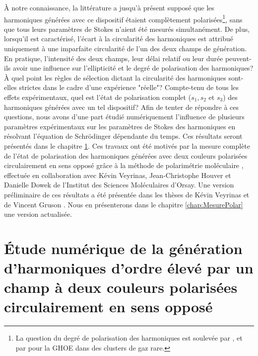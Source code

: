 \`{A} notre connaissance, la littérature a jusqu'à présent supposé que les harmoniques générées avec ce dispositif étaient complètement polarisées\footnote{La question du degré de polarisation des harmoniques est soulevée par , et par  pour la GHOE dans des clusters de gaz rare.}, sans que tous leurs paramètres de Stokes n'aient été mesurés simultanément. De plus, lorsqu'il est caractérisé, l'écart à la circularité des harmoniques est attribué uniquement à une imparfaite circularité de l'un des deux champs de génération. En pratique, l'intensité des deux champs, leur délai relatif ou leur durée peuvent-ils avoir une influence sur l'ellipticité et le degré de polarisation des harmoniques? \`{A} quel point les règles de sélection dictant la circularité des harmoniques sont-elles strictes dans le cadre d'une expérience "réelle"? Compte-tenu de tous les effets expérimentaux, quel est l'état de polarisation complet ($s_1, s_2$ et $s_3$) des harmoniques générées avec un tel dispositif? Afin de tenter de répondre à ces questions, nous avons d'une part étudié numériquement l'influence de plusieurs paramètres expérimentaux sur les paramètres de Stokes des harmoniques en résolvant l'équation de Schrödinger dépendante du temps. Ces résultats seront présentés dans le chapitre \ref{chap:calculsTA}. Ces travaux ont été motivés par la mesure complète de l'état de polarisation des harmoniques générées avec deux couleurs polarisées circulairement en sens opposé grâce à la méthode de polarimétrie moléculaire , effectuée en collaboration avec Kévin Veyrinas, Jean-Christophe Houver et Danielle Dowek de l'Institut des Sciences Moléculaires d'Orsay. Une version préliminaire de ces résultats a été présentée dans les thèses de Kévin Veyrinas  et de Vincent Gruson . Nous en présenterons dans le chapitre \ref{chap:MesurePolar} une version actualisée.

\chapter[Etude numérique de la GHOE par un champ à deux couleurs polarisées circulairement en sens opposé]{\'{E}tude numérique de la génération d'harmoniques d'ordre élevé par un champ à deux couleurs polarisées circulairement en sens opposé}
\label{chap:calculsTA}

